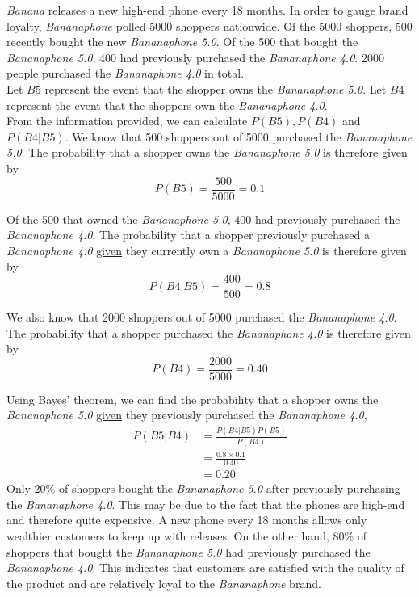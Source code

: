 \begin{example}
\textit{Banana} releases a new high-end phone every 18 months. In order to gauge brand loyalty, \textit{Bananaphone} polled 5000 shoppers nationwide. Of the 5000 shoppers, 500 recently bought the new \textit{Bananaphone 5.0}. Of the 500 that bought the \textit{Bananaphone 5.0}, 400 had previously purchased the \textit{Bananaphone 4.0}. 2000 people purchased the \textit{Bananaphone 4.0} in total.  \\

Let $B5$ represent the event that the shopper owns the \textit{Bananaphone 5.0}. Let $B4$ represent the event that the shoppers own the \textit{Bananaphone 4.0}. \\

From the information provided, we can calculate $P(B5), P(B4)$ and $P(B4|B5)$. We know that 500 shoppers out of 5000 purchased the \textit{Bananaphone 5.0}. The probability that a shopper owns the \textit{Bananaphone 5.0} is therefore given by
\[P(B5) = \frac{500}{5000} = 0.1 \]

Of the 500 that owned the \textit{Bananaphone 5.0}, 400 had previously purchased the \textit{Bananaphone 4.0}. The probability that a shopper previously purchased a \textit{Bananaphone 4.0} \underline{given} they currently own a \textit{Bananaphone 5.0} is therefore given by
\[ P(B4|B5) = \frac{400}{500} = 0.8\]

We also know that 2000 shoppers out of 5000 purchased the \textit{Bananaphone 4.0}. The probability that a shopper purchased the \textit{Bananaphone 4.0} is therefore given by
\[ P(B4) = \frac{2000}{5000} = 0.40\]

Using Bayes' theorem, we can find the probability that a shopper owns the \textit{Bananaphone 5.0} \underline{given} they previously purchased the \textit{Bananaphone 4.0},
\begin{align*}
P(B5|B4) 	&= \frac{P(B4|B5)P(B5)}{P(B4)} \\\
			&= \frac{ 0.8 \times 0.1 }{0.40} \\
			&= 0.20
\end{align*}
Only 20\% of shoppers bought the \textit{Bananaphone 5.0} after previously purchasing the \textit{Bananaphone 4.0}. This may be due to the fact that the phones are high-end and therefore quite expensive. A new phone every 18 months allows only wealthier customers to keep up with releases. On the other hand, 80\% of shoppers that bought the \textit{Bananaphone 5.0} had previously purchased the \textit{Bananaphone 4.0}. This indicates that customers are satisfied with the quality of the product and are relatively loyal to the \textit{Bananaphone} brand.
\end{example}

